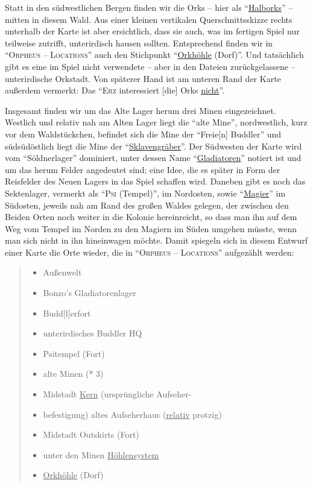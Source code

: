 \documentclass[a5paper,pagesize,numbers=noenddot]{scrbook}
\begin{document}
Statt in den südwestlichen Bergen finden wir die Orks -- hier als \enquote{\uline{Halborks}}\autocite[S.~11]{orpheus_b_scribbles} -- mitten in diesem Wald.
Aus einer kleinen vertikalen Querschnittsskizze rechts unterhalb der Karte ist aber ersichtlich, dass sie auch, was im fertigen Spiel nur teilweise zutrifft, unterirdisch hausen sollten.
Entsprechend finden wir in \enquote{\textsc{Orpheus -- Locations}} auch den Stichpunkt \enquote{\uline{Orkhöhle} (Dorf)}.\autocite[S.~5]{orpheus_b_scribbles}
Und tatsächlich gibt es eine im Spiel nicht verwendete -- aber in den Dateien zurückgelassene -- unterirdische Orkstadt.\autocite[Vgl.][]{wog_level_2023}
Von späterer Hand ist am unteren Rand der Karte außerdem vermerkt:
Das \enquote{\textsc{Erz} interessiert [die] Orks \uline{nicht}}.\autocite[S.~11]{orpheus_b_scribbles}

Insgesamt finden wir um das Alte Lager herum drei Minen eingezeichnet.
Westlich und relativ nah am Alten Lager liegt die \enquote{alte Mine}, nordwestlich, kurz vor dem Waldstückchen, befindet sich die Mine der \enquote{Freie[n] Buddler} und südsüdöstlich liegt die Mine der \enquote{\uline{Sklavengräber}}.
Der Südwesten der Karte wird vom \enquote{Söldnerlager} dominiert, unter dessen Name \enquote{\uline{Gladiatoren}} notiert ist und um das herum Felder angedeutet sind; eine Idee, die es später in Form der Reisfelder des Neuen Lagers in das Spiel schaffen wird.
Daneben gibt es noch das Sektenlager, vermerkt als \enquote{\textsc{Psi} (Tempel)}, im Nordosten, sowie \enquote{\uline{Magier}} im Südosten, jeweils nah am Rand des großen Waldes gelegen, der zwischen den Beiden Orten noch weiter in die Kolonie hereinreicht, so dass man ihn auf dem Weg vom Tempel im Norden zu den Magiern im Süden umgehen müsste, wenn man sich nicht in ihn hineinwagen möchte.\autocite[S.~11]{orpheus_b_scribbles}
Damit spiegeln sich in diesem Entwurf einer Karte die Orte wieder, die in \enquote{\textsc{Orpheus -- Locations}} aufgezählt werden:

\begin{quote}
   \begin{itemize}
      \item[1)] Außenwelt
      \item[2)] Bonzo's Gladiatorenlager %
      \item[3)] Budd[l]erfort
      \item[3b)] unterirdisches Buddler HQ
      \item[4)] Psitempel (Fort)
      \item[5)] alte Minen (* 3)
      \item[6)] Midstadt \uline{Kern} (ursprüngliche Aufseher-
      \item[] befestigung) altes Aufseherhaus (\uline{relativ} protzig)
      \item[7)] Midstadt Outskirts (Fort)
      \item[8)] unter den Minen \uline{Höhlensystem}
      \item[9)] \uline{Orkhöhle} (Dorf)\autocite[S.~5]{orpheus_b_scribbles}
   \end{itemize}
\end{quote}
\end{document}
